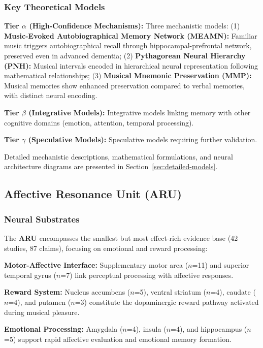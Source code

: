 \documentclass[9pt,onecolumn]{article}
\newcommand{\ARU}{\textcolor{arucolor}{\textbf{ARU}}}
\begin{document}
\subsubsection{Key Theoretical Models}

\textbf{Tier $\alpha$ (High-Confidence Mechanisms):} Three mechanistic models: (1) \textbf{Music-Evoked Autobiographical Memory Network (MEAMN):} Familiar music triggers autobiographical recall through hippocampal-prefrontal network, preserved even in advanced dementia; (2) \textbf{Pythagorean Neural Hierarchy (PNH):} Musical intervals encoded in hierarchical neural representation following mathematical relationships; (3) \textbf{Musical Mnemonic Preservation (MMP):} Musical memories show enhanced preservation compared to verbal memories, with distinct neural encoding.

\textbf{Tier $\beta$ (Integrative Models):} Integrative models linking memory with other cognitive domains (emotion, attention, temporal processing).

\textbf{Tier $\gamma$ (Speculative Models):} Speculative models requiring further validation.

Detailed mechanistic descriptions, mathematical formulations, and neural architecture diagrams are presented in Section~\ref{sec:detailed-models}.

\subsection{Affective Resonance Unit (\ARU{})}

\subsubsection{Neural Substrates}

The \ARU{} encompasses the smallest but most effect-rich evidence base (42 studies, 87 claims), focusing on emotional and reward processing:

\textbf{Motor-Affective Interface:} Supplementary motor area ($n$=11) and superior temporal gyrus ($n$=7) link perceptual processing with affective responses.

\textbf{Reward System:} Nucleus accumbens ($n$=5), ventral striatum ($n$=4), caudate ($n$=4), and putamen ($n$=3) constitute the dopaminergic reward pathway activated during musical pleasure.

\textbf{Emotional Processing:} Amygdala ($n$=4), insula ($n$=4), and hippocampus ($n$=5) support rapid affective evaluation and emotional memory formation.
\end{document}
